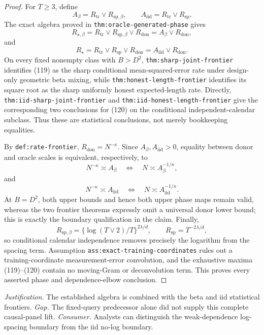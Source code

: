 \documentclass{article}
\begin{document}
\begin{proof}
For \(T\geq3\), define
\[
A_\beta=R_{\mathrm{tr}}\vee R_{\mathrm{sp},\beta},
\qquad
A_{\mathrm{iid}}=R_{\mathrm{tr}}\vee R_{\mathrm{sp}}.
\]
The exact algebra proved in \texttt{thm:oracle-generated-phase} gives
\[
R_{\star,\beta}=R_{\mathrm{tr}}\vee R_{\mathrm{sp},\beta}\vee R_{\mathrm{don}}
=A_\beta\vee R_{\mathrm{don}},
\tag{119}
\]
and
\[
R_\star=R_{\mathrm{tr}}\vee R_{\mathrm{sp}}\vee R_{\mathrm{don}}
=A_{\mathrm{iid}}\vee R_{\mathrm{don}}.
\tag{120}
\]
On every fixed nonempty class with \(B>D^2\), \texttt{thm:sharp-joint-frontier} identifies (119) as the sharp conditional mean-squared-error rate under design-only geometric beta mixing, while \texttt{thm:honest-length-frontier} identifies its square root as the sharp uniformly honest expected-length rate.  Directly, \texttt{thm:iid-sharp-joint-frontier} and \texttt{thm:iid-honest-length-frontier} give the corresponding two conclusions for (120) on the conditional independent-calendar subclass.  Thus these are statistical conclusions, not merely bookkeeping equalities.

By \texttt{def:rate-frontier}, \(R_{\mathrm{don}}=N^{-\kappa}\).  Since \(A_\beta,A_{\mathrm{iid}}>0\), equality between donor and oracle scales is equivalent, respectively, to
\[
N^{-\kappa}\asymp A_\beta
\quad\Longleftrightarrow\quad
N\asymp A_\beta^{-1/\kappa},
\tag{121}
\]
and
\[
N^{-\kappa}\asymp A_{\mathrm{iid}}
\quad\Longleftrightarrow\quad
N\asymp A_{\mathrm{iid}}^{-1/\kappa}.
\tag{122}
\]
At \(B=D^2\), both upper bounds and hence both upper phase maps remain valid, whereas the two frontier theorems expressly omit a universal donor lower bound; this is exactly the boundary qualification in the claim.  Finally,
\[
R_{\mathrm{sp},\beta}
=\{\log(T\vee2)/T\}^{2\lambda/d},
\qquad
R_{\mathrm{sp}}=T^{-2\lambda/d},
\]
so conditional calendar independence removes precisely the logarithm from the spacing term.  Assumption \texttt{ass:exact-training-coordinates} rules out a training-coordinate measurement-error convolution, and the exhaustive maxima (119)--(120) contain no moving-Gram or deconvolution term.  This proves every asserted phase and dependence-elbow conclusion.
\end{proof}
\par\smallskip\noindent \textit{Justification.} The established algebra is combined with the beta and iid statistical frontiers. \textit{Gap.} The fixed-query predecessor alone did not supply this complete causal-panel lift. \textit{Consumer.} Analysts can distinguish the weak-dependence log-spacing boundary from the iid no-log boundary.
\end{document}

